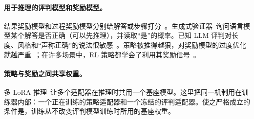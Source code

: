 \paragraph{用于推理的评判模型和奖励模型。} 结果奖励模型和过程奖励模型分别给解答或步骤打分~\cite{lightman2024verify,wang2024mathshepherd}。生成式验证器~\cite{zhang2024genverifier}询问语言模型某个解答是否正确（可以先推理），并读取“是”的概率。已知 LLM 评判对长度、风格和“声称正确”的说法很敏感~\cite{zheng2023judging}。策略被推得越狠，对奖励模型的过度优化就越严重~\cite{gao2023scaling}；在许多场景中，RL 策略都学会了利用其奖励信号~\cite{skalse2022defining,denison2024sycophancy,baker2025monitoring}。

\paragraph{策略与奖励之间共享权重。} 多 LoRA 推理~\cite{hu2022lora,kwon2023vllm}让多个适配器在推理时共用一个基座模型。这里把同一机制用在训练器内部：一个正在训练的策略适配器和一个冻结的评判适配器。使之严格成立的条件是，训练从不改变评判模型训练时所用的基座权重。
